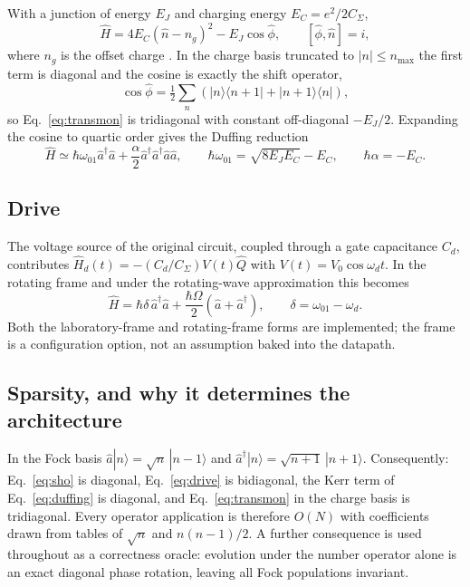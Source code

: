 \documentclass[smallextended]{svjour3}
\begin{document}
With a junction of energy $E_J$ and charging energy $E_C = e^2/2C_\Sigma$,
\begin{equation}
\hat{H} = 4 E_C (\hat{n} - n_g)^2 - E_J \cos\hat{\phi},
\qquad [\hat{\phi}, \hat{n}] = i,
\label{eq:transmon}
\end{equation}
where $n_g$ is the offset charge \cite{koch2007}. In the charge basis truncated to
$|n| \le n_{\max}$ the first term is diagonal and the cosine is exactly the shift
operator,
\begin{equation}
\cos\hat{\phi} = \tfrac{1}{2}\sum_n \left( |n\rangle\langle n{+}1| +
|n{+}1\rangle\langle n| \right),
\label{eq:cosphi}
\end{equation}
so Eq.~\eqref{eq:transmon} is tridiagonal with constant off-diagonal $-E_J/2$. Expanding
the cosine to quartic order gives the Duffing reduction
\begin{equation}
\hat{H} \simeq \hbar\omega_{01}\hat{a}^\dagger\hat{a}
+ \frac{\alpha}{2}\hat{a}^\dagger\hat{a}^\dagger\hat{a}\hat{a},
\qquad
\hbar\omega_{01} = \sqrt{8E_JE_C} - E_C,
\qquad
\hbar\alpha = -E_C .
\label{eq:duffing}
\end{equation}

\subsection{Drive}

The voltage source of the original circuit, coupled through a gate capacitance $C_d$,
contributes $\hat{H}_d(t) = -(C_d/C_\Sigma) V(t) \hat{Q}$ with $V(t) = V_0\cos\omega_d t$.
In the rotating frame and under the rotating-wave approximation this becomes
\begin{equation}
\hat{H} = \hbar\delta\,\hat{a}^\dagger\hat{a}
+ \frac{\hbar\Omega}{2}\left(\hat{a} + \hat{a}^\dagger\right),
\qquad \delta = \omega_{01} - \omega_d .
\label{eq:drive}
\end{equation}
Both the laboratory-frame and rotating-frame forms are implemented; the frame is a
configuration option, not an assumption baked into the datapath.

\subsection{Sparsity, and why it determines the architecture}

In the Fock basis $\hat{a}|n\rangle = \sqrt{n}\,|n-1\rangle$ and
$\hat{a}^\dagger|n\rangle = \sqrt{n+1}\,|n+1\rangle$. Consequently:
Eq.~\eqref{eq:sho} is diagonal, Eq.~\eqref{eq:drive} is bidiagonal, the Kerr term of
Eq.~\eqref{eq:duffing} is diagonal, and Eq.~\eqref{eq:transmon} in the charge basis is
tridiagonal. Every operator application is therefore $O(N)$ with coefficients drawn from
tables of $\sqrt{n}$ and $n(n-1)/2$. A further consequence is used throughout as a
correctness oracle: evolution under the number operator alone is an exact diagonal phase
rotation, leaving all Fock populations invariant.
\end{document}
